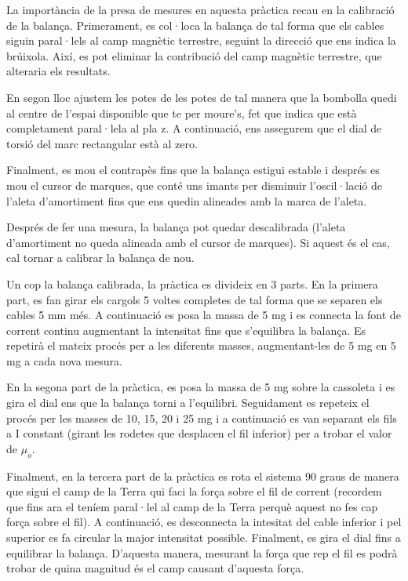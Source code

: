 \documentclass[11pt]{article}
\numberwithin{equation}{section}
\numberwithin{figure}{section}
\numberwithin{table}{section}
\begin{document}
La importància de la presa de mesures en aquesta pràctica recau en la calibració de la balança. Primerament, es col·loca la balança de tal forma que els cables siguin paral·lels al camp magnètic terrestre, seguint la direcció que ens indica la brúixola. Així, es pot eliminar la contribució del camp
magnètic terrestre, que alteraria els resultats. 

En segon lloc ajustem les potes de les potes de tal manera que la bombolla quedi al centre de l'espai disponible que te per moure's, fet que indica que està completament paral·lela al pla z. A continuació, ens assegurem que el dial de torsió del marc rectangular està al zero. 

Finalment, es mou el contrapès fins que la balança estigui estable i després es mou el cursor de marques, que conté uns imants per disminuir l'oscil·lació de l'aleta d'amortiment fins que ens quedin alineades amb la marca de l'aleta.

Després de fer una mesura, la balança pot quedar descalibrada (l'aleta d'amortiment no queda alineada amb el cursor de marques). Si aquest és el cas, cal tornar a calibrar la balança de nou.

Un cop la balança calibrada, la pràctica es divideix en 3 parts. En la primera part, es fan girar els cargols 5 voltes completes de tal forma que se separen els cables 5 mm més. A continuació es posa la massa de 5 mg i es connecta la font de corrent continu augmentant la intensitat fins que
s'equilibra la balança. Es repetirà el mateix procés per a les diferents masses, augmentant-les de 5 mg en 5 mg a cada nova mesura.

En la segona part de la pràctica, es posa la massa de 5 mg sobre la cassoleta i es gira el dial ens que la balança torni a l'equilibri. Seguidament es repeteix el procés per les masses de 10, 15, 20 i 25 mg i a continuació es van separant els fils a I constant (girant les rodetes que desplacen el fil inferior) per a trobar el valor de $\mu_o$.

Finalment, en la tercera part de la pràctica es rota el sistema 90 graus de manera que sigui el camp de la Terra qui faci la força sobre el fil de corrent (recordem que fins ara el teníem paral·lel al camp de la Terra perquè aquest no fes cap força sobre el fil). A continuació, es desconnecta la intesitat del cable inferior i pel superior es fa circular la major intensitat possible. Finalment, es gira el dial fins a equilibrar la balança. D’aquesta manera, mesurant la força que rep el fil es podrà trobar de quina magnitud és el camp causant d’aquesta força.
\end{document}
